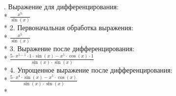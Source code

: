 \documentclass[a4paper, 12pt]{minimal}
\begin{document}
	{
		. Выражение для дифференцирования:\\*
		\indent $ \frac{x^{5}}{\sin{(x)}} $\\*
		2. Первоначальная обработка выражения:\\*
		\indent $ \frac{x^{5}}{\sin{(x)}} $\\*
		3. Выражение после дифференцирования:\\*
		\indent $ \frac{{{5}\cdot{{x^{5-1}}\cdot{1}}}\cdot{\sin{(x)}}-{x^{5}}\cdot{{\cos{(x)}}\cdot{1}}}{{\sin{(x)}}\cdot{\sin{(x)}}} $\\*
		4. Упрощенное выражение после дифференцирования:\\*
		\indent $ \frac{{{5}\cdot{x^{4}}}\cdot{\sin{(x)}}-{x^{5}}\cdot{\cos{(x)}}}{{\sin{(x)}}\cdot{\sin{(x)}}} $\\*
	}
\end{document}

